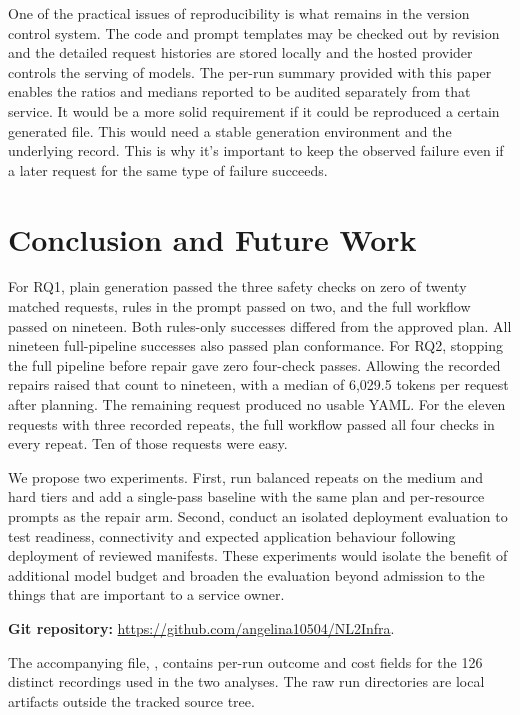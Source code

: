\documentclass[12pt,onecolumn,draftclsnofoot]{IEEEtran}
\begin{document}
One of the practical issues of reproducibility is what remains in the version control system. The code and prompt templates may be checked out by revision and the detailed request histories are stored locally and the hosted provider controls the serving of models. The per-run summary provided with this paper enables the ratios and medians reported to be audited separately from that service. It would be a more solid requirement if it could be reproduced a certain generated file. This would need a stable generation environment and the underlying record. This is why it's important to keep the observed failure even if a later request for the same type of failure succeeds.


\section{Conclusion and Future Work}
For RQ1, plain generation passed the three safety checks on zero of twenty matched requests, rules in the prompt passed on two, and the full workflow passed on nineteen. Both rules-only successes differed from the approved plan. All nineteen full-pipeline successes also passed plan conformance. For RQ2, stopping the full pipeline before repair gave zero four-check passes. Allowing the recorded repairs raised that count to nineteen, with a median of 6,029.5 tokens per request after planning. The remaining request produced no usable YAML. For the eleven requests with three recorded repeats, the full workflow passed all four checks in every repeat. Ten of those requests were easy.

We propose two experiments. First, run balanced repeats on the medium and hard tiers and add a single-pass baseline with the same plan and per-resource prompts as the repair arm. Second, conduct an isolated deployment evaluation to test readiness, connectivity and expected application behaviour following deployment of reviewed manifests. These experiments would isolate the benefit of additional model budget and broaden the evaluation beyond admission to the things that are important to a service owner.

\noindent\textbf{Git repository:} \url{https://github.com/angelina10504/NL2Infra}.
\par\noindent The accompanying file, , contains per-run outcome and cost fields for the 126 distinct recordings used in the two analyses. The raw run directories are local artifacts outside the tracked source tree.
\end{document}
